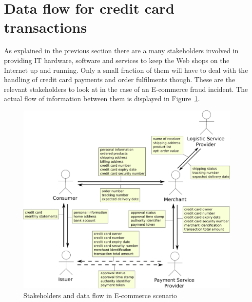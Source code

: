 
\section{Data flow for credit card transactions}
\label{sec:stakeholder_data_flow}

As explained in the previous section there are a many stakeholders involved in providing \gls{IT} hardware, software and services to keep the Web shops on the Internet up and running. Only a small fraction of them will have to deal with the handling of credit card payments and order fulfilments though. These are the relevant stakeholders to look at in the case of an \gls{E-commerce} fraud incident. The actual flow of information between them is displayed in  Figure~\ref{fig:images_e_commerce_stakeholder}. \@

\begin{figure}[H]
	\centering
		\includegraphics[width=0.9\columnwidth]{images/e-commerce-stakeholder.pdf}
	\caption{Stakeholders and data flow in \gls{E-commerce} scenario}
\label{fig:images_e_commerce_stakeholder}
\end{figure}
